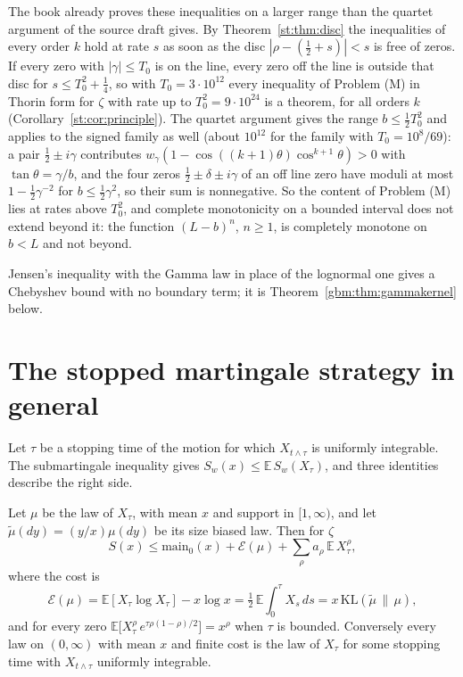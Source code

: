 The book already proves these inequalities on a larger range than the quartet argument of the source draft gives. By Theorem~\ref{st:thm:disc} the inequalities of every order $k$ hold at rate $s$ as soon as the disc $|\rho-(\frac12+s)|<s$ is free of zeros. If every zero with $|\gamma|\le T_0$ is on the line, every zero off the line is outside that disc for $s\le T_0^2+\frac14$, so with $T_0=3\cdot10^{12}$ every inequality of Problem (M) in Thorin form for $\zeta$ with rate up to $T_0^2=9\cdot10^{24}$ is a theorem, for all orders $k$ (Corollary~\ref{st:cor:principle}). The quartet argument gives the range $b\le\frac12T_0^2$ and applies to the signed family as well (about $10^{12}$ for the family with $T_0=10^8/69$): a pair $\frac12\pm i\gamma$ contributes $w_\gamma(1-\cos((k+1)\theta)\cos^{k+1}\theta)>0$ with $\tan\theta=\gamma/b$, and the four zeros $\frac12\pm\delta\pm i\gamma$ of an off line zero have moduli at most $1-\frac12\gamma^{-2}$ for $b\le\frac12\gamma^2$, so their sum is nonnegative. So the content of Problem (M) lies at rates above $T_0^2$, and complete monotonicity on a bounded interval does not extend beyond it: the function $(L-b)^n$, $n\ge1$, is completely monotone on $b<L$ and not beyond.

Jensen's inequality with the Gamma law in place of the lognormal one gives a Chebyshev bound with no boundary term; it is Theorem~\ref{gbm:thm:gammakernel} below.

\section{The stopped martingale strategy in general}\label{gbm:sec:strategy}

Let $\tau$ be a stopping time of the motion for which $X_{t\wedge\tau}$ is uniformly integrable. The submartingale inequality gives $S_w(x)\le\mathbb E\,S_w(X_\tau)$, and three identities describe the right side.

\begin{theorem}\label{gbm:thm:strategy}
Let $\mu$ be the law of $X_\tau$, with mean $x$ and support in $[1,\infty)$, and let $\tilde\mu(dy)=(y/x)\mu(dy)$ be its size biased law. Then for $\zeta$
\[
S(x)\le\mathrm{main}_0(x)+\mathcal E(\mu)+\sum_\rho a_\rho\,\mathbb E\,X_\tau^\rho ,
\]
where the cost is
\[
\mathcal E(\mu)=\mathbb E[X_\tau\log X_\tau]-x\log x=\tfrac12\,\mathbb E\int_0^\tau X_s\,ds=x\,\mathrm{KL}(\tilde\mu\,\|\,\mu),
\]
and for every zero $\mathbb E\bigl[X_\tau^\rho\,e^{\tau\rho(1-\rho)/2}\bigr]=x^\rho$ when $\tau$ is bounded. Conversely every law on $(0,\infty)$ with mean $x$ and finite cost is the law of $X_\tau$ for some stopping time with $X_{t\wedge\tau}$ uniformly integrable.
\end{theorem}

